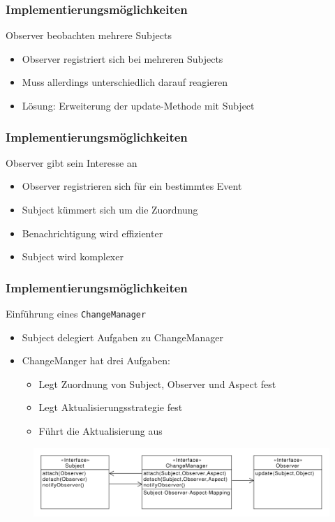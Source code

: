 \begin{frame}
\frametitle{Implementierungsmöglichkeiten}
		  \begin{block}{Observer beobachten mehrere Subjects}
		  	\begin{itemize}
		  		\item Observer registriert sich bei mehreren Subjects
		  		\item Muss allerdings unterschiedlich darauf reagieren
		  		\item Lösung: Erweiterung der update-Methode mit Subject
		  	\end{itemize}
		  \end{block}
\end{frame}

\begin{frame}
\frametitle{Implementierungsmöglichkeiten}
		\begin{block}{Observer gibt sein Interesse an}
  		 \begin{itemize}
		  	\item Observer registrieren sich für ein bestimmtes Event
		  	\item Subject kümmert sich um die Zuordnung
		  	\item Benachrichtigung wird effizienter
		  	\item Subject wird komplexer
		  \end{itemize}  
  		\end{block}		
\end{frame}

\begin{frame}
\frametitle{Implementierungsmöglichkeiten}
		\begin{block}{Einführung eines \texttt{ChangeManager}}
  		 \begin{itemize}
		  	\item Subject delegiert Aufgaben zu ChangeManager
		  	\item ChangeManger hat drei Aufgaben:
		  	\begin{itemize}
		  		\item Legt Zuordnung von Subject, Observer und Aspect fest
		  		\item Legt Aktualisierungsstrategie fest
		  		\item Führt die Aktualisierung aus
		  	\end{itemize}
		  \end{itemize}  
  		\end{block}		
  		\begin{figure}
		\includegraphics[scale=.4]{paper/observer/changemanager}
	\end{figure}
\end{frame}

